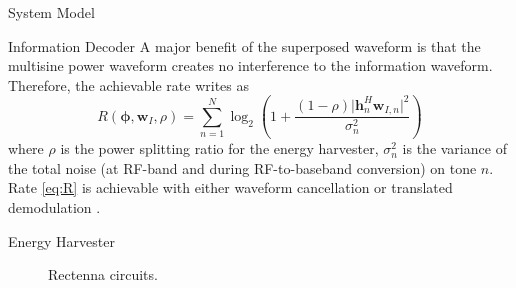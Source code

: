 \documentclass[journal]{IEEEtran}
\begin{document}
\begin{section}{System Model}
		\begin{subsection}{Information Decoder}
			A major benefit of the superposed waveform is that the multisine power waveform creates no interference to the information waveform. Therefore, the achievable rate writes as
			\begin{equation}\label{eq:R}
				R(\boldsymbol{\phi},\boldsymbol{w}_I,\rho) = \sum_{n=1}^N{\log_2\left(1+\frac{(1-\rho)\lvert \boldsymbol{h}_{n}^H\boldsymbol{w}_{I,n} \rvert^2}{\sigma_n^2}\right)}
			\end{equation}
			where $\rho$ is the power splitting ratio for the energy harvester, $\sigma_n^2$ is the variance of the total noise (at RF-band and during RF-to-baseband conversion) on tone $n$. Rate \ref{eq:R} is achievable with either waveform cancellation or translated demodulation \cite{Clerckx2018b}.
		\end{subsection}


		\begin{subsection}{Energy Harvester}
			\begin{figure}[!t]
				\centering
				\noindent
				\begin{minipage}[b]{0.5\linewidth}
					\centering
				\end{minipage}%
				\begin{minipage}[b]{0.5\linewidth}
					\centering
				\end{minipage}
				\caption{Rectenna circuits.}
			\end{figure}


\end{subsection}
\end{section}
\end{document}
